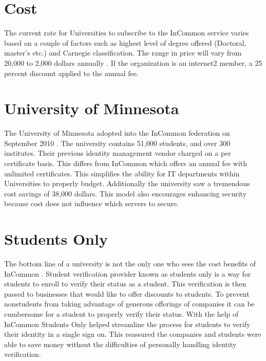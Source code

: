 \documentclass[9pt,twocolumn,twoside]{../../styles/osajnl}
\begin{document}
\section{Cost}

The current rate for Universities to subscribe to the InCommon service
varies based on a couple of factors such as highest level of degree
offered (Doctoral, master’s etc.) and Carnegie classification.  The
range in price will vary from 20,000 to 2,000 dollars annually
\cite{www-price}.  If the organization is an internet2 member, a 25
percent discount applied to the annual fee.


\section{University of Minnesota}


The University of Minnesota adopted into the InCommon federation on
September 2010 \cite{www-casestudy1}.  The university contains 51,000
students, and over 300 institutes.  Their previous identity management
vendor charged on a per certificate basis.  This differs from InCommon
which offers an annual fee with unlimited certificates.  This
simplifies the ability for IT departments within Universities to
properly budget.  Additionally the university saw a tremendous  cost
savings of 38,000 dollars.  This model also encourages enhancing
security because cost does not influence which servers to secure.

\section{Students Only}

The bottom line of a university is not the only one who sees the cost
benefits of InCommon \cite{www-casestudy2}.  Student verification
provider known as students only is a way for students to enroll to
verify their status as a student.  This verification is then passed to
businesses that would like to offer discounts to students.  To prevent
nonstudents from taking advantage of generous 
offerings of companies it can be cumbersome for a student to properly
verify their status.  With the help of InCommon Students Only helped
streamline the process for students to verify their identity in a
single sign on.  This reassured the companies and students were able
to save money without the difficulties of personally handling identity
verification.
\end{document}
